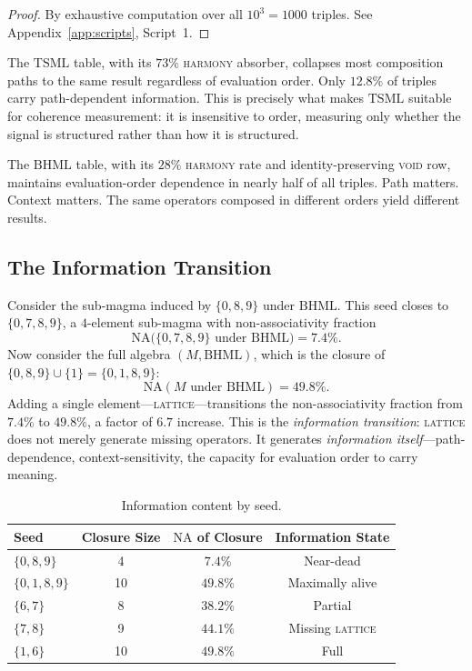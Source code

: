 \documentclass[11pt,a4paper]{article}
\theoremstyle{definition}
\theoremstyle{remark}
\newcommand{\NA}{\mathrm{NA}}
\newcommand{\TSML}{\mathrm{TSML}}
\newcommand{\BHML}{\mathrm{BHML}}
\begin{document}
\begin{proof}
By exhaustive computation over all $10^{3}=1000$ triples. See Appendix~\ref{app:scripts}, Script~1.
\end{proof}

The $\TSML$ table, with its $73\%$ \textsc{harmony} absorber, collapses most composition paths to the same result regardless of evaluation order. Only $12.8\%$ of triples carry path-dependent information. This is precisely what makes $\TSML$ suitable for coherence measurement: it is insensitive to order, measuring only whether the signal is structured rather than how it is structured.

The $\BHML$ table, with its $28\%$ \textsc{harmony} rate and identity-preserving \textsc{void} row, maintains evaluation-order dependence in nearly half of all triples. Path matters. Context matters. The same operators composed in different orders yield different results.

\subsection{The Information Transition}\label{sec:info-transition}

Consider the sub-magma induced by $\{0,8,9\}$ under $\BHML$. This seed closes to $\{0,7,8,9\}$, a $4$-element sub-magma with non-associativity fraction
\[
\NA\bigl(\{0,7,8,9\}\text{ under }\BHML\bigr) = 7.4\%.
\]
Now consider the full algebra $(M,\BHML)$, which is the closure of $\{0,8,9\}\cup\{1\}=\{0,1,8,9\}$:
\[
\NA(M\text{ under }\BHML) = 49.8\%.
\]
Adding a single element---\textsc{lattice}---transitions the non-associativity fraction from $7.4\%$ to $49.8\%$, a factor of $6.7$ increase. This is the \emph{information transition}: \textsc{lattice} does not merely generate missing operators. It generates \emph{information itself}---path-dependence, context-sensitivity, the capacity for evaluation order to carry meaning.

\begin{table}[ht]
\centering
\caption{Information content by seed.}\label{tab:info-seeds}
\begin{tabular}{lccc}
\toprule
Seed & Closure Size & $\NA$ of Closure & Information State \\
\midrule
$\{0,8,9\}$ & 4 & $7.4\%$ & Near-dead \\
$\{0,1,8,9\}$ & 10 & $49.8\%$ & Maximally alive \\
$\{6,7\}$ & 8 & $38.2\%$ & Partial \\
$\{7,8\}$ & 9 & $44.1\%$ & Missing \textsc{lattice} \\
$\{1,6\}$ & 10 & $49.8\%$ & Full \\
\bottomrule
\end{tabular}
\end{table}
\end{document}
